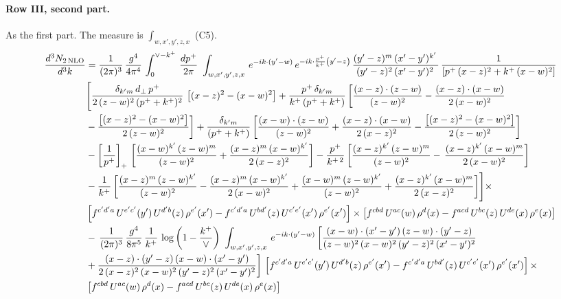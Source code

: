 \documentclass[10pt]{article}
\numberwithin{equation}{section}
\begin{document}
\paragraph{Row III, second part.}
As the first part. The measure is $\int_{w,x',y',z,x}$ (C5).
\begin{align}
 \frac{d^{3}N_{2\,\rm NLO}}{d^{3}k} & =  \frac{1}{(2\pi)^{3}}\,\frac{g^{4}}{4\pi^{4}}\,\int_{0}^{\vee-k^{+}}\, \frac{dp^{+}}{2\pi}\,\,\int_{w,x',y',z,x}\, e^{-ik\cdot (y'-w)}\,e^{-ik\cdot \frac{p^{+}}{k^{+}}\left(y'-z\right)}\, \frac{(y'-z)^{m}\,(x'-y')^{k'}\,}{(y'-z)^{2}\,(x'-y')^{2}\,}\, \frac{1}{\left[p^{+}\,(x-z)^{2}+k^{+}\,(x-w)^{2}\right]}\notag \\ & \Bigg[\frac{\delta_{k'm}\,d_{\perp}\,p^{+}}{2\,(z-w)^{2}\,(p^{+}+k^{+})^{2}}\, \left[(x-z)^{2}-(x-w)^{2}\right]+\frac{p^{+}\,\delta_{k'm}}{k^{+}\,(p^{+}+k^{+})}\,\bigg[\frac{(x-z)\cdot (z-w)}{(z-w)^{2}} -\frac{(x-z)\cdot (x-w)}{2\,(x-w)^{2}}\notag \\ & -\frac{\left[(x-z)^{2}-(x-w)^{2}\right]}{2\,(z-w)^{2}}\bigg] +\frac{\delta_{k'm}}{(p^{+}+k^{+})}\,\bigg[\frac{(x-w)\cdot (z-w)}{(z-w)^{2}}+\frac{(x-z)\cdot (x-w)}{2\,(x-z)^{2}} -\frac{\left[(x-z)^{2}-(x-w)^{2}\right]}{2\,(z-w)^{2}}\bigg]\notag \\ & -\left[\frac{1}{p^{+}}\right]_{+}\,\bigg[\frac{(x-w)^{k'}\,(z-w)^{m}}{(z-w)^{2}}+\frac{(x-z)^{m}\,(x-w)^{k'}}{2\,(x-z)^{2}}\bigg]-\frac{p^{+}}{k^{+\,2}}\,\bigg[\frac{(x-z)^{k'}\,(z-w)^{m}}{(z-w)^{2}} -\,\frac{(x-z)^{k'}\,(x-w)^{m}}{2\,(x-w)^{2}}\bigg]\notag \\ & -\frac{1}{k^{+}}\,\bigg[\frac{(x-z)^{m}\,(z-w)^{k'}}{(z-w)^{2}}-\frac{(x-z)^{m}\,(x-w)^{k'}}{2\,(x-w)^{2}}+\frac{(x-w)^{m}\,(z-w)^{k'}}{(z-w)^{2}} +\frac{(x-z)^{k'}\,(x-w)^{m}}{2\,(x-z)^{2}}\bigg]\Bigg]\times\,\notag \\ & \left[f^{c'd'a}\,U^{e'c'}(y')\,U^{d'b}(z)\,\rho^{e'}(x')-f^{c'd'a}\, 
    U^{bd'}(z)\,U^{c'e'}(x')\,\rho^{e'}(x')\right]\times \left[f^{cbd}\,U^{ac}(w)\,\rho^{d}(x) -f^{acd}\,U^{bc}(z)\,U^{de}(x)\,\rho^{e}(x)\right] \notag \\
&  -\, \frac{1}{(2\pi)^{3}}\,\frac{g^{4}}{8\pi^{5}}\,\frac{1}{k^{+}}\,\log{\left(1-\frac{k^{+}}{\vee}\right)}\,\,\int_{w,x',y',z,x}\, e^{-ik\cdot (y'-w)}\,\bigg[\frac{(x-w)\cdot (x'-y')\,(z-w)\cdot (y'-z)}{(z-w)^{2}\,(x-w)^{2}\,(y'-z)^{2}\,(x'-y')^{2}}\notag \\ & +\frac{(x-z)\cdot (y'-z)\,(x-w)\cdot (x'-y')}{2\,(x-z)^{2}\,(x-w)^{2}\,(y'-z)^{2}\,(x'-y')^{2}}\bigg]\, \left[f^{c'd'a}\,U^{e'c'}(y')\,U^{d'b}(z)\,\rho^{e'}(x')-f^{c'd'a}\, 
    U^{bd'}(z)\,U^{c'e'}(x')\,\rho^{e'}(x')\right]\times\notag \\ &  \left[f^{cbd}\,U^{ac}(w)\,\rho^{d}(x) -f^{acd}\,U^{bc}(z)\,U^{de}(x)\,\rho^{e}(x)\right] \label{eq:R:G3III2}
\end{align}
\end{document}
